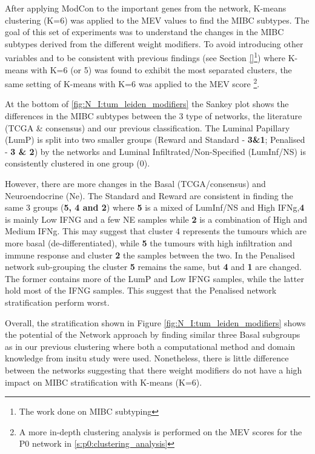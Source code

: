 After applying ModCon to the important genes from the network, K-means clustering (K=6) was applied to the MEV values to find the MIBC subtypes. The goal of this set of experiments was to understand the changes in the MIBC subtypes derived from the different weight modifiers. To avoid introducing other variables and to be consistent with previous findings (see Section \ref{}\footnote{The work done on MIBC subtyping}) where K-means with K=6 (or 5) was found to exhibit the most separated clusters, the same setting of K-means with K=6 was applied to the MEV score \footnote{A more in-depth clustering analysis is performed on the MEV scores for the P0 network in \cref{s:p0:clustering_analysis}}.


At the bottom of \cref{fig:N_I:tum_leiden_modifiers} the Sankey plot shows the differences in the MIBC subtypes between the 3 type of networks, the literature (TCGA \& consensus) and our previous classification. The Luminal Papillary (LumP) is split into two smaller groups (Reward and Standard - \textbf{3\&1}; Penalised - \textbf{3 \& 2}) by the networks and Luminal Infiltrated/Non-Specified (LumInf/NS) is consistently clustered in one group (0). 

However, there are more changes in the Basal (TCGA/consensus) and Neuroendocrine (Ne). The Standard and Reward are consistent in finding the same 3 groups (\textbf{5, 4 and 2}) where \textbf{5} is a mixed of LumInf/NS and High IFNg,\textbf{4} is mainly Low IFNG and a few NE samples while \textbf{2} is a combination of High and Medium IFNg. This may suggest that cluster 4 represents the tumours which are more basal (de-differentiated), while \textbf{5} the tumours with high infiltration and immune response and cluster \textbf{2} the samples between the two. In the Penalised network sub-grouping the cluster \textbf{5} remains the same, but \textbf{4} and \textbf{1} are changed. The former contains more of the LumP and Low IFNG samples, while the latter hold most of the IFNG samples. This suggest that the Penalised network stratification perform worst.

Overall, the stratification shown in Figure \ref{fig:N_I:tum_leiden_modifiers} shows the potential of the Network approach by finding similar three Basal subgroups as in our previous clustering where both a computational method and domain knowledge from insitu study\citet{Baker2022-bj} were used. Nonetheless, there is little difference between the networks suggesting that there weight modifiers do not have a high impact on MIBC stratification with K-means (K=6).

